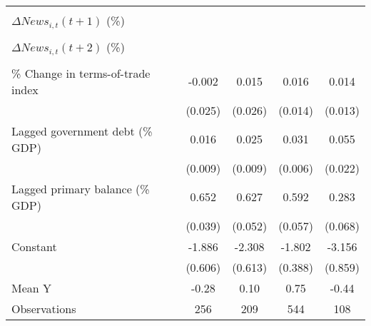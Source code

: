 {\begin{tabular}{l*{4}{c}}
                    &                     &                     &                     &                     \\
\addlinespace
$ \Delta News_{i,t}(t+1)$ (\%)&                     &                     &                     &                     \\
                    &                     &                     &                     &                     \\
\addlinespace
$ \Delta News_{i,t}(t+2)$ (\%)&                     &                     &                     &                     \\
                    &                     &                     &                     &                     \\
\addlinespace
\% Change in terms-of-trade index&      -0.002         &       0.015         &       0.016         &       0.014         \\
                    &     (0.025)         &     (0.026)         &     (0.014)         &     (0.013)         \\
\addlinespace
Lagged government debt (\% GDP)&       0.016\sym{*}  &       0.025\sym{**} &       0.031\sym{***}&       0.055\sym{**} \\
                    &     (0.009)         &     (0.009)         &     (0.006)         &     (0.022)         \\
\addlinespace
Lagged primary balance (\% GDP)&       0.652\sym{***}&       0.627\sym{***}&       0.592\sym{***}&       0.283\sym{***}\\
                    &     (0.039)         &     (0.052)         &     (0.057)         &     (0.068)         \\
\addlinespace
Constant            &      -1.886\sym{***}&      -2.308\sym{***}&      -1.802\sym{***}&      -3.156\sym{***}\\
                    &     (0.606)         &     (0.613)         &     (0.388)         &     (0.859)         \\
\midrule
Mean Y              &       -0.28         &        0.10         &        0.75         &       -0.44         \\
Observations        &         256         &         209         &         544         &         108         \\
\bottomrule
\end{tabular}
}
